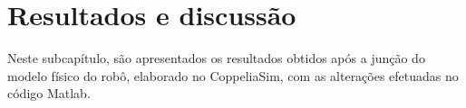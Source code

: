 \chapter{Resultados e discussão}
\label{ch:res-e-disc}

Neste subcapítulo, são apresentados os resultados obtidos após a junção do modelo físico do robô, elaborado no CoppeliaSim, com as alterações efetuadas no código Matlab.


